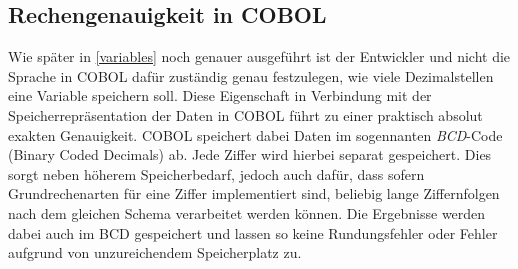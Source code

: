 \subsection*{Rechengenauigkeit in COBOL}
Wie später in \autoref{variables} noch genauer ausgeführt ist der Entwickler und nicht die Sprache in COBOL dafür zuständig genau festzulegen, wie viele Dezimalstellen eine Variable speichern soll. Diese Eigenschaft in Verbindung mit der Speicherrepräsentation der Daten in COBOL führt zu einer praktisch absolut exakten Genauigkeit. COBOL speichert dabei Daten im sogennanten \textit{BCD}-Code (Binary Coded Decimals)  ab. Jede Ziffer wird hierbei separat gespeichert. Dies sorgt neben höherem Speicherbedarf, jedoch auch dafür, dass sofern Grundrechenarten für eine Ziffer implementiert sind, beliebig lange Ziffernfolgen nach dem gleichen Schema verarbeitet werden können. Die Ergebnisse werden dabei auch im BCD gespeichert und lassen so keine Rundungsfehler oder Fehler aufgrund von unzureichendem Speicherplatz zu.